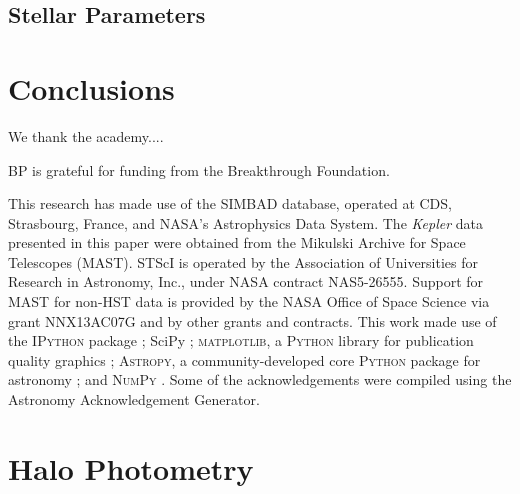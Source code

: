 \documentclass[modern]{aastex61}
\newcommand{\kepler}{\emph{Kepler}\xspace}
\begin{document}
\subsection{Stellar Parameters}

\section{Conclusions}

\acknowledgments

We thank the academy....

BP is grateful for funding from the Breakthrough Foundation. %

This research has made use of the SIMBAD database, operated at CDS, Strasbourg, France, and NASA's Astrophysics Data System. The \kepler data presented in this paper were obtained from the Mikulski Archive for Space Telescopes (MAST). STScI is operated by the Association of Universities for Research in Astronomy, Inc., under NASA contract NAS5-26555. Support for MAST for non-HST data is provided by the NASA Office of Space Science via grant NNX13AC07G and by other grants and contracts.  This work made use of the \textsc{IPython} package \citep{PER-GRA:2007}; SciPy \citep{jones_scipy_2001};  \textsc{matplotlib}, a \textsc{Python} library for publication quality graphics \citep{Hunter:2007}; \textsc{Astropy}, a community-developed core \textsc{Python} package for astronomy \citep{2013A&A...558A..33A}; and \textsc{NumPy} \citep{van2011numpy}. Some of the acknowledgements were compiled using the Astronomy Acknowledgement Generator.

\appendix

\section{Halo Photometry}
\label{halo}
\end{document}

